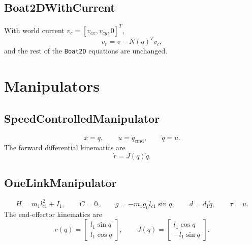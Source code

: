 \documentclass[11pt]{article}
\begin{document}
\subsection{Boat2DWithCurrent}
With world current \(v_c=[v_{cx},v_{cy},0]^T\),
\begin{equation}
    v_r = v - N(q)^Tv_c,
\end{equation}
and the rest of the \texttt{Boat2D} equations are unchanged.

\section{Manipulators}

\subsection{SpeedControlledManipulator}
\begin{equation}
    x=q,\qquad u=\dot q_{\mathrm{cmd}},\qquad \dot q=u.
\end{equation}
The forward differential kinematics are
\begin{equation}
    \dot r = J(q)\dot q.
\end{equation}

\subsection{OneLinkManipulator}
\begin{equation}
    H=m_1l_{c1}^2+I_1,
    \qquad
    C=0,
    \qquad
    g=-m_1g_0l_{c1}\sin q,
    \qquad
    d=d_1\dot q,
    \qquad
    \tau=u.
\end{equation}
The end-effector kinematics are
\begin{equation}
    r(q)=\begin{bmatrix}l_1\sin q\\l_1\cos q\end{bmatrix},
    \qquad
    J(q)=\begin{bmatrix}l_1\cos q\\-l_1\sin q\end{bmatrix}.
\end{equation}
\end{document}
